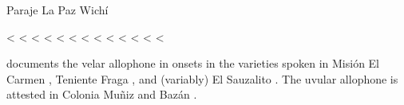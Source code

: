 \ea
Paraje La Paz Wichí \citep{AFG067}\\
    \begin{xlist}
        \ex {} <  \label{plp-grayheron}
        \ex {} < 
        \ex {} \recind {} < 
        \ex {} < 
        \ex {} < 
        \ex {} < 
        \ex {} <  \label{plp-bile}
        \ex {} <  \label{plp-all}
        \ex {} < 
        \ex {} < 
        \ex {} < 
        \ex {} <  \label{plp-flies}
        \ex {} <  \label{plp-thing}
    \end{xlist}
\z

\citet{MC09} documents the velar allophone in onsets in the varieties spoken in Misión El Carmen , Teniente Fraga , and (variably) El Sauzalito . The uvular allophone is attested in Colonia Muñiz  and Bazán .


